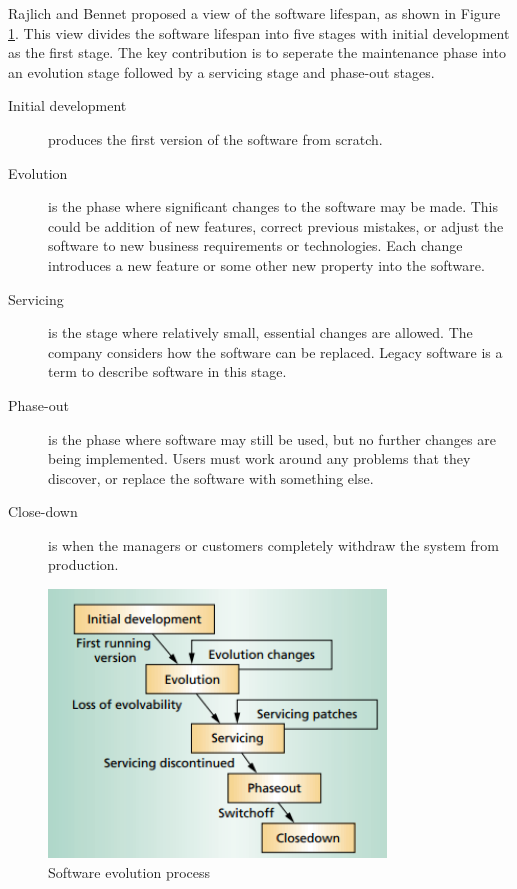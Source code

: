 Rajlich and Bennet\cite{Bennett:2000:SME:336512.336534} proposed a view of the software lifespan, as shown in Figure \ref{fig:lifespan-1}. This view divides the software lifespan into five stages with initial development as the first stage. The key contribution is to seperate the maintenance phase into an evolution stage followed by a servicing stage and phase-out stages.
\begin{description}
	\item[Initial development] produces the first version of the software from scratch.
	\item[Evolution] is the phase where significant changes to the software may be made. This could be addition of new features, correct previous mistakes, or adjust the software to new business requirements or technologies. Each change introduces a new feature or some other new property into the software.
	\item[Servicing] is the stage where relatively small, essential changes are allowed. The company considers how the software can be replaced. Legacy software is a term to describe software in this stage.
	\item[Phase-out] is the phase where software may still be used, but no further changes are being implemented. Users must work around any problems that they discover, or replace the software with something else.
	\item[Close-down] is when the managers or customers completely withdraw the system from production.
\end{description} 

\begin{figure}[ht!]
	\centering
	\includegraphics[width=0.8\textwidth]{images/lifespan-1.png}
	\caption{Software evolution process}
	\label{fig:lifespan-1}
\end{figure}

